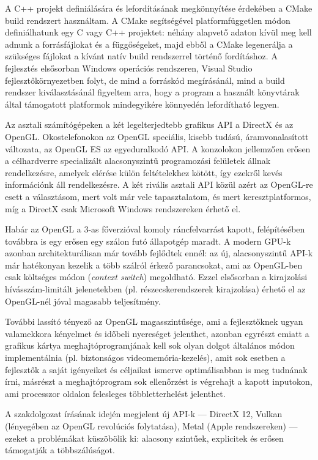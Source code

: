 A C++ projekt definiálására és lefordításának megkönnyítése érdekében a CMake build rendszert használtam. A CMake segítségével platformfüggetlen módon definiálhatunk egy C vagy C++ projektet: néhány alapvető adaton kívül meg kell adnunk a forrásfájlokat és a függőségeket, majd ebből a CMake legenerálja a szükséges fájlokat a kívánt natív build rendszerrel történő fordításhoz. A fejlesztés elsősorban Windows operációs rendszeren, Visual Studio fejlesztőkörnyezetben folyt, de mind a forráskód megírásánál, mind a build rendszer kiválasztásánál figyeltem arra, hogy a program a használt könyvtárak által támogatott platformok mindegyikére könnyedén lefordítható legyen.

Az asztali számítógépeken a két legelterjedtebb grafikus API a DirectX és az OpenGL. Okostelefonokon az OpenGL speciális, kisebb tudású, áramvonalasított változata, az OpenGL ES az egyeduralkodó API. A konzolokon jellemzően erősen a célhardverre specializált alacsonyszintű programozási felületek állnak rendelkezésre, amelyek elérése külön feltételekhez kötött, így ezekről kevés információnk áll rendelkezésre. A két rivális asztali API közül azért az OpenGL-re esett a választásom, mert volt már vele tapasztalatom, és mert keresztplatformos, míg a DirectX csak Microsoft Windows rendszereken érhető el.

Habár az OpenGL a 3-as főverzióval komoly ráncfelvarrást kapott, felépítésében továbbra is egy erősen egy szálon futó állapotgép maradt. A modern GPU-k azonban architekturálisan már tovább fejlődtek ennél: az új, alacsonyszintű API-k már hatékonyan kezelik a több szálról érkező parancsokat, ami az OpenGL-ben csak költséges módon (\textit{context switch}) megoldható. Ezzel elsősorban a kirajzolási hívásszám-limitált jelenetekben (pl. részecskerendszerek kirajzolása) érhető el az OpenGL-nél jóval magasabb teljesítmény.

További lassító tényező az OpenGL magasszintűsége, ami a fejlesztőknek ugyan valamekkora kényelmet és időbeli nyereséget jelenthet, azonban egyrészt emiatt a grafikus kártya meghajtóprogramjának kell sok olyan dolgot általános módon implementálnia (pl. biztonságos videomemória-kezelés), amit sok esetben a fejlesztők a saját igényeiket és céljaikat ismerve optimálisabban is meg tudnának írni, másrészt a meghajtóprogram sok ellenőrzést is végrehajt a kapott inputokon, ami processzor oldalon felesleges többletterhelést jelenthet.

A szakdolgozat írásának idején megjelent új API-k --- DirectX 12, Vulkan (lényegében az OpenGL revolúciós folytatása), Metal (Apple rendszereken) --- ezeket a problémákat küszöbölik ki: alacsony szintűek, explicitek és erősen támogatják a többszálúságot.

